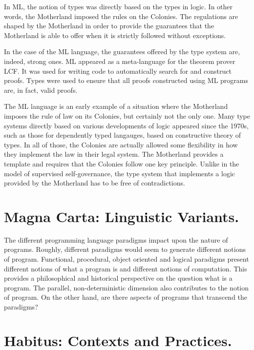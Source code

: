 \documentclass[]{article}
\begin{document}
In ML, the notion of types was directly based on the types in logic. In other words, the Motherland imposed the rules on the Colonies. The regulations are shaped by the Motherland in order to provide the guarantees that the Motherland is able to offer when it is strictly followed without exceptions.

In the case of the ML language, the guarantees offered by the type system are, indeed, strong ones. ML appeared as a meta-language for the theorem prover LCF. It was used for writing code to automatically search for and construct proofs. Types were used to ensure that all proofs constructed using ML programs are, in fact, valid proofs.

The ML language is an early example of a situation where the Motherland imposes the rule of law on its Colonies, but certainly not the only one. Many type systems directly based on various developments of logic appeared since the 1970s, such as those for dependently typed langauges, based on constructive theory of types. In all of those, the Colonies are actually allowed some flexibility in how they implement the law in their legal system. The Motherland provides a template and requires that the Colonies follow one key principle. Unlike in the model of supervised self-governance, the type system that implements a logic provided by the Motherland has to be free of contradictions.

{\color{red}{Tomas?}}

{\color{red}{Wendy?}}

\section{Magna Carta: Linguistic Variants.}

{\color{red}{Ray's note}}

The different programming language paradigms impact upon the nature of programs. Roughly, different paradigms would seem to generate different notions of program. Functional, procedural, object oriented and logical paradigms present different notions of what a program is and different notions of computation. This provides a philosophical and historical perspective on the question what is a program. The parallel, non-deterministic dimension also contributes to the notion of program. On the other hand, are there aspects of programs that transcend the paradigms?



\section{Habitus: Contexts and Practices.}
\end{document}
